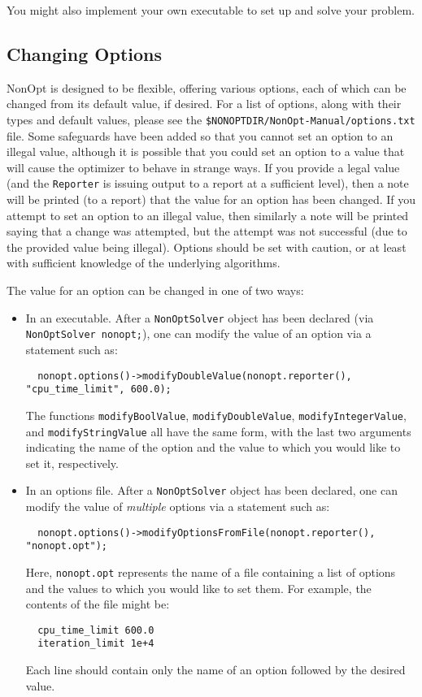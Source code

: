 \documentclass{article}
\begin{document}
You might also implement your own executable to set up and solve your problem.

\subsection{Changing Options}\label{sec.options}

NonOpt is designed to be flexible, offering various options, each of which can be changed from its default value, if desired.  For a list of options, along with their types and default values, please see the \texttt{\$NONOPTDIR/NonOpt-Manual/options.txt} file.  Some safeguards have been added so that you cannot set an option to an illegal value, although it is possible that you could set an option to a value that will cause the optimizer to behave in strange ways.  If you provide a legal value (and the \texttt{Reporter} is issuing output to a report at a sufficient level), then a note will be printed (to a report) that the value for an option has been changed.  If you attempt to set an option to an illegal value, then similarly a note will be printed saying that a change was attempted, but the attempt was not successful (due to the provided value being illegal).  Options should be set with caution, or at least with sufficient knowledge of the underlying algorithms.

The value for an option can be changed in one of two ways:

\begin{itemize}
  \item In an executable.  After a \texttt{NonOptSolver} object has been declared (via \texttt{NonOptSolver nonopt;}), one can modify the value of an option via a statement such as:
  \begin{verbatim}
  nonopt.options()->modifyDoubleValue(nonopt.reporter(), "cpu_time_limit", 600.0);
  \end{verbatim}
  The functions \texttt{modifyBoolValue}, \texttt{modifyDoubleValue}, \texttt{modifyIntegerValue}, and \texttt{modifyStringValue} all have the same form, with the last two arguments indicating the name of the option and the value to which you would like to set it, respectively.
  \item In an options file. After a \texttt{NonOptSolver} object has been declared, one can modify the value of \emph{multiple} options via a statement such as:
  \begin{verbatim}
  nonopt.options()->modifyOptionsFromFile(nonopt.reporter(), "nonopt.opt");
  \end{verbatim}
  Here, \texttt{nonopt.opt} represents the name of a file containing a list of options and the values to which you would like to set them.  For example, the contents of the file might be:
  \begin{verbatim}
  cpu_time_limit 600.0
  iteration_limit 1e+4
  \end{verbatim}
  Each line should contain only the name of an option followed by the desired value.
\end{itemize}
\end{document}
